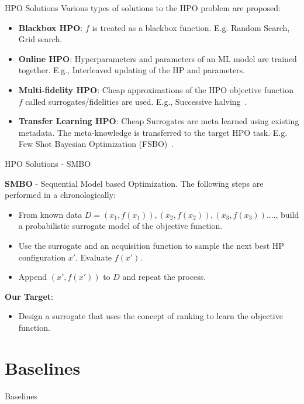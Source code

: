 \documentclass{beamer}
\begin{document}
\begin{frame}[t]{HPO Solutions}
Various types of solutions to the HPO problem are proposed:
\begin{itemize}
\item \textbf{Blackbox HPO}: $f$ is treated as a blackbox function. E.g. Random Search, Grid search.
\item \textbf{Online HPO}: Hyperparameters and parameters of an ML model are trained together. E.g., Interleaved updating of the HP and parameters. 
\item \textbf{Multi-fidelity HPO}: Cheap approximations of the HPO objective function $f$ called surrogates/fidelities are used.
E.g., Successive halving~\cite{successivehalving}.
\item \textbf{Transfer Learning HPO}: Cheap Surrogates are meta learned using existing metadata.
The meta-knowledge is transferred to the target HPO task. 
E.g.  Few Shot Bayesian Optimization (FSBO)~\cite{fsbopaper}.
\end{itemize}
\end{frame}

\begin{frame}[t]{HPO Solutions - SMBO}

\textbf{SMBO} - Sequential Model based Optimization. The following steps are performed in a chronologically:

\begin{itemize}
\item From known data $D = {(x_1, f(x_1)), (x_2, f(x_2)), (x_3, f(x_3)) .... }$, build a probabilistic surrogate model of the objective function.
\item Use the surrogate and an acquisition function to sample the next best HP configuration $x'$. Evaluate $f(x')$.
\item Append $(x', f(x'))$ to $D$ and repeat the process.
\end{itemize}

\textbf{Our Target}:

\begin{itemize}
\item Design a surrogate that uses the concept of ranking to learn the objective function.
\end{itemize}
\end{frame}


\section{Baselines}
\begin{frame}

\centering
\LARGE{Baselines}

\end{frame}
\end{document}

